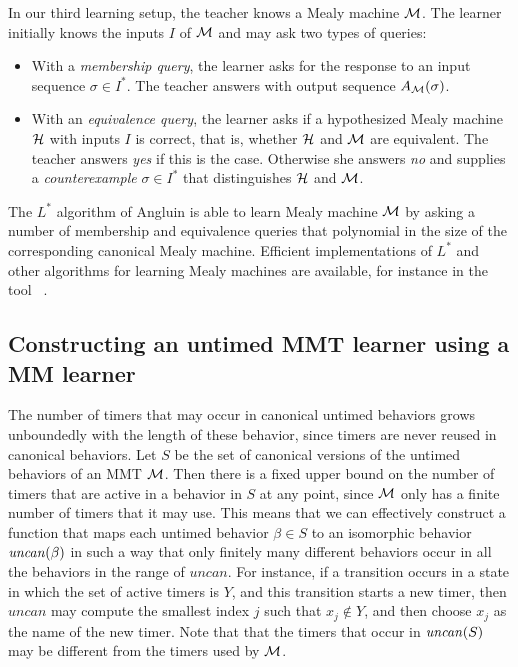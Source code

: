 In our third learning setup, the teacher knows a Mealy machine ${\cal M}$. 
The learner initially knows the inputs $I$ of ${\cal M}$ and may ask two types of queries:
\begin{itemize}
\item
With a \emph{membership query}, the learner asks for the response to an input sequence $\sigma \in I^{\ast}$.
The teacher answers with output sequence $A_{{\cal M}}(\sigma)$.
\item
With an \emph{equivalence query}, the learner asks if a hypothesized Mealy machine ${\cal H}$ with
inputs $I$ is correct, that is, whether ${\cal H}$ and ${\cal M}$ are equivalent.
The teacher answers \emph{yes} if this is the case. Otherwise she answers \emph{no} and supplies a
\emph{counterexample} $\sigma \in I^{\ast}$ that distinguishes ${\cal H}$ and ${\cal M}$.
\end{itemize}
The $L^{\ast}$ algorithm of Angluin \cite{Ang87} is able to learn Mealy machine ${\cal M}$ by asking a
number of membership and equivalence queries that polynomial in the size of the corresponding canonical Mealy machine.
Efficient implementations of $L^{\ast}$ and other algorithms for learning Mealy machines are available,
for instance in the tool \learnlib\ \cite{Nie03,RSBM09,MertenSHM11}.

\subsection{Constructing an untimed MMT learner using a MM learner}
The number of timers that may occur in canonical untimed behaviors grows unboundedly with the length of these behavior,
since timers are never reused in canonical behaviors.
Let $S$ be the set of canonical versions of the untimed behaviors of an MMT ${\cal M}$.
Then there is a fixed upper bound on the number of timers that are active in a behavior in $S$ at any point,
since ${\cal M}$ only has a finite number of timers that it may use.
This means that we can effectively construct a function that maps each untimed behavior $\beta \in S$
to an isomorphic behavior $\mathit{uncan}({\beta})$ in such a way that only finitely many
different behaviors occur in all the behaviors in the range of $\mathit{uncan}$.
For instance, if a transition occurs in a state in which the set of active timers is $Y$, and this transition
starts a new timer, then $\mathit{uncan}$ may compute the smallest index $j$
such that $x_j \not\in Y$, and then choose $x_j$ as the name of the new timer.
Note that that the timers that occur in $\mathit{uncan}({S})$ may be different from the timers used by ${\cal M}$.

